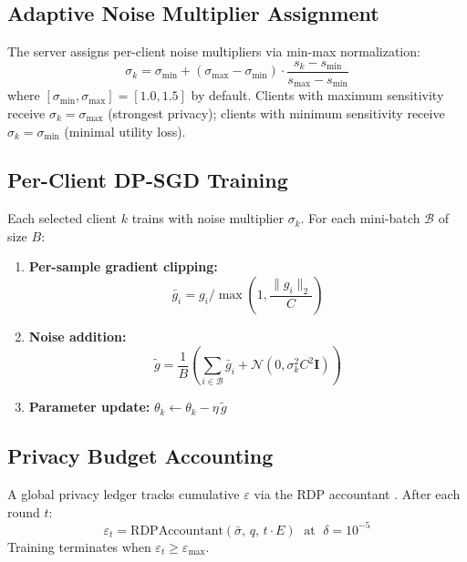\documentclass[journal]{IEEEtran}
\begin{document}
\subsection{Adaptive Noise Multiplier Assignment}
The server assigns per-client noise multipliers via min-max normalization:
\begin{equation}
  \sigma_k = \sigma_{\min} + (\sigma_{\max}-\sigma_{\min})\cdot
  \frac{s_k - s_{\min}}{s_{\max} - s_{\min}}
  \label{eq:noise}
\end{equation}
where $[\sigma_{\min},\sigma_{\max}]=[1.0,1.5]$ by default. Clients with
maximum sensitivity receive $\sigma_k=\sigma_{\max}$ (strongest privacy);
clients with minimum sensitivity receive $\sigma_k=\sigma_{\min}$ (minimal
utility loss).

\subsection{Per-Client DP-SGD Training}
Each selected client $k$ trains with noise multiplier $\sigma_k$.
For each mini-batch $\mathcal{B}$ of size $B$:

\begin{enumerate}
  \item \textbf{Per-sample gradient clipping:}
        \begin{equation}
          \bar{g}_i = g_i\big/\max\!\left(1,\frac{\|g_i\|_2}{C}\right)
          \label{eq:clip}
        \end{equation}
  \item \textbf{Noise addition:}
        \begin{equation}
          \tilde{g} = \frac{1}{B}\!\left(\sum_{i\in\mathcal{B}}\bar{g}_i
          + \mathcal{N}\!\left(0,\sigma_k^2 C^2\mathbf{I}\right)\right)
          \label{eq:noisygrad}
        \end{equation}
  \item \textbf{Parameter update:} $\theta_k\leftarrow\theta_k - \eta\,\tilde{g}$
\end{enumerate}

\subsection{Privacy Budget Accounting}
A global privacy ledger tracks cumulative $\varepsilon$ via the RDP
accountant \cite{mironov2017}. After each round $t$:
\begin{equation}
  \varepsilon_t = \mathrm{RDPAccountant}(\bar{\sigma},\,q,\,t\cdot E)
  \;\text{ at }\;\delta=10^{-5}
  \label{eq:budget}
\end{equation}
Training terminates when $\varepsilon_t \geq \varepsilon_{\max}$.
\end{document}
